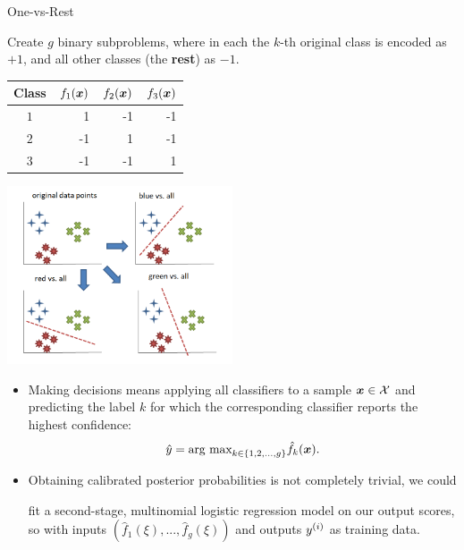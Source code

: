 \begin{vbframe}{One-vs-Rest }


Create $g$ binary subproblems, where in each the $k$-th original class is encoded as $+1$, and all other classes (the \textbf{rest}) as $- 1$.


\begin{table}[]
  \footnotesize
  \begin{tabular}{|c|r|r|r|} \hline
  \textbf{Class}  & \textbf{$f_1{(\bm{x})}$} & \textbf{$f_2{(\bm{x})}$}  & \textbf{$f_3{(\bm{x})}$} \\ \hline
  \textbf{$1$}  &   1                 &  -1                   &  -1                   \\ \hline
  \textbf{$2$}  &  -1                 &  1                   & -1                   \\ \hline
  \textbf{$3$}  &  -1                 & -1                   &  1                   \\ \hline
  \end{tabular}
  \end{table}


    \begin{center}
    \includegraphics[width=0.5\textwidth]{figure_man/one_vs_all.png}
    \end{center}

  \begin{itemize}
    \item Making decisions means applying all classifiers to a sample $\bm{x} \in \mathcal{X}$ and predicting the label $k$ for which the corresponding classifier reports the highest confidence: 
    $$
      \hat y = \text{arg max}_{k \in \{1, 2, ..., g\}} \hat f_k(\bm{x}). 
    $$

    \item Obtaining calibrated posterior probabilities is not completely trivial, we could

    fit a second-stage, multinomial logistic regression model on our output scores, so with inputs $\left(\hat f_1(\xi), ..., \hat f_g(\xi)\right)$ and outputs $y^{(i)}$ as training data. 

  \end{itemize}
  \vspace*{0.2cm}


\end{vbframe}


